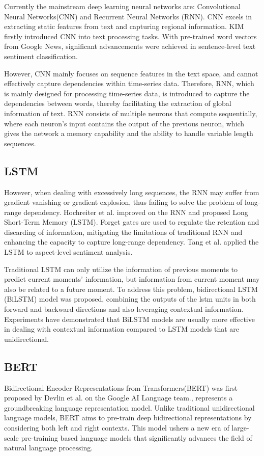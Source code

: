 \documentclass[ %
                    author={Louis Wang},
                supervisor={Dr. Qiang Liu},
                    degree={MSc},
                     title={Identification of Suicide Ideation in Texts},
                      type={},
                      year={2024}]{dissertation}
\begin{document}
Currently the mainstream deep learning neural networks are: Convolutional Neural Networks(CNN)\cite{chua1998cnn} and Recurrent Neural Networks (RNN)\cite{socher2011parsing}. CNN excels in extracting static features from text and capturing regional information. KIM firstly introduced CNN into text processing tasks. With pre-trained word vectors from Google News, significant advancements were achieved in sentence-level text sentiment classification.\cite{2014Convolutional} 

However, CNN mainly focuses on sequence features in the text space, and cannot effectively capture dependencies within time-series data. Therefore, RNN, which is mainly designed for processing time-series data, is introduced to capture the dependencies between words, thereby facilitating the extraction of global information of text. RNN consists of multiple neurons that compute sequentially, where each neuron's input contains the output of the previous neuron, which gives the network a memory capability and the ability to handle variable length sequences.

\subsection{LSTM}
\noindent
However, when dealing with excessively long sequences, the RNN may suffer from gradient vanishing or gradient explosion, thus failing to solve the problem of long-range dependency. Hochreiter et al. improved on the RNN and proposed Long Short-Term Memory (LSTM).\cite{hochreiter1997long} Forget gates are used to regulate the retention and discarding of information\cite{greff2016lstm}, mitigating the limitations of traditional RNN and enhancing the capacity to capture long-range dependency. Tang et al. applied the LSTM to aspect-level sentiment analysis.\cite{tang2015target}

Traditional LSTM can only utilize the information of previous moments to predict current moments' information, but information from current moment may also be related to a future moment. To address this problem, bidirectional LSTM (BiLSTM) model was proposed, combining the outputs of the lstm units in both forward and backward directions and also leveraging contextual information. Experiments have demonstrated that BiLSTM models are usually more effective in dealing with contextual information compared to LSTM models that are unidirectional.\cite{hameed2019computationally}

\subsection{BERT}
\noindent
Bidirectional Encoder Representations from Transformers(BERT) was first proposed by Devlin et al. on the Google AI Language team.\cite{devlin2018bert}, represents a groundbreaking language representation model. Unlike traditional unidirectional language models, BERT aims to pre-train deep bidirectional representations by considering both left and right contexts. This model ushers a new era of large-scale pre-training based language models that significantly advances the field of natural language processing.
\end{document}

